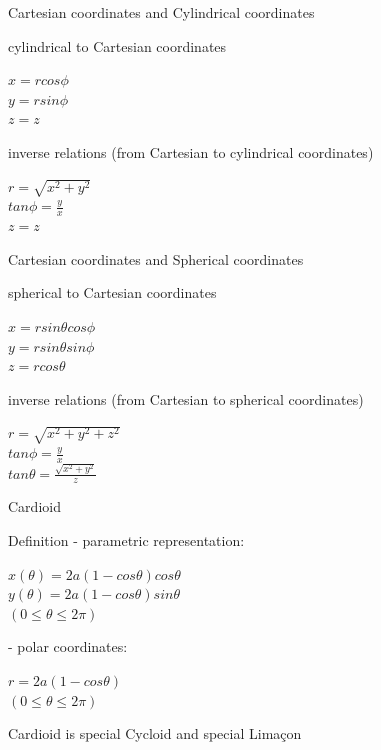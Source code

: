\begin{frame}{Cartesian coordinates and Cylindrical coordinates}
    \begin{block}{cylindrical to Cartesian coordinates}
        \begin{center}
            $x=r cos \phi$\\
            $y=r sin \phi$\\
            $z=z$
        \end{center}
    \end{block}
    \begin{block}{inverse relations (from Cartesian to cylindrical coordinates) }
        \begin{center}
            $r=\sqrt{x^2+y^2}$\\
            $tan \phi=\frac{y}{x}$\\
            $z=z$
        \end{center}
    \end{block}
\end{frame}

\begin{frame}{Cartesian coordinates and Spherical coordinates}
    \begin{block}{spherical to Cartesian coordinates}
        \begin{center}
            $x=r sin \theta cos \phi$\\
            $y=r sin\theta sin \phi$\\
            $z=r cos\theta$
        \end{center}
    \end{block}
    \begin{block}{inverse relations (from Cartesian to spherical coordinates) }
        \begin{center}
            $r=\sqrt{x^2+y^2+z^2}$\\
            $tan \phi=\frac{y}{x}$\\
            $tan \theta=\frac{\sqrt{x^2+y^2}}{z}$
        \end{center}
    \end{block}
\end{frame}

\begin{frame}{Cardioid}
    \begin{block}{Definition}
        - parametric representation:
        \begin{center}
            $x(\theta)=2a(1-cos \theta)cos \theta$\\
            $y(\theta)=2a(1-cos \theta)sin \theta$\\
            $(0\leqslant \theta \leqslant 2\pi)$
        \end{center}
        - polar coordinates:
        \begin{center}
            $r =2a(1-cos \theta)$\\
            $(0\leqslant \theta \leqslant 2\pi)$
        \end{center}
        Cardioid is special Cycloid and special Limaçon
    \end{block}
\end{frame}

